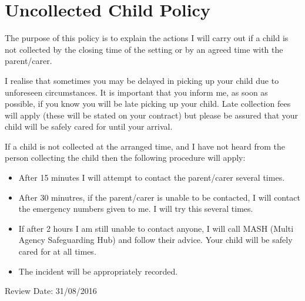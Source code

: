 

\section{Uncollected Child Policy}

The purpose of this policy is to explain the actions I will carry out if
a child is not collected by the closing time of the setting or by an
agreed time with the parent/carer.

I realise that sometimes you may be delayed in picking up your child due
to unforeseen circumstances. It is important that you inform me, as soon
as possible, if you know you will be late picking up your child. Late
collection fees will apply (these will be stated on your contract) but
please be assured that your child will be safely cared for until your
arrival.

If a child is not collected at the arranged time, and I have not heard
from the person collecting the child then the following procedure will
apply:

\begin{itemize}
\item
  After 15 minutes I will attempt to contact the parent/carer several
  times.
\item
  After 30 minutres, if the parent/carer is unable to be contacted, I
  will contact the emergency numbers given to me. I will try this
  several times.
\item
  If after 2 hours I am still unable to contact anyone, I will call
  MASH (Multi Agency Safeguarding Hub) and follow their advice. Your
  child will be safely cared for at all times.
\item
  The incident will be appropriately recorded.
\end{itemize}

Review Date: 31/08/2016


